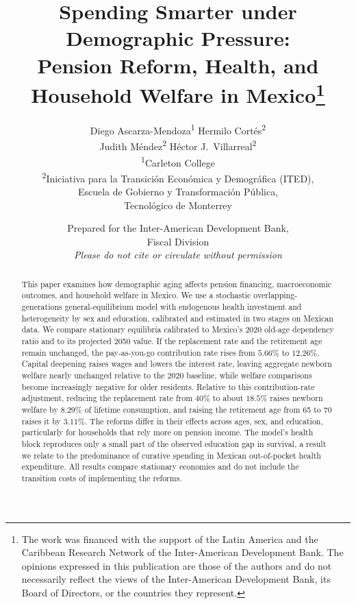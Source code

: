 \documentclass[12pt,a4paper]{article}
\begin{document}
\title{\textbf{Spending Smarter under Demographic Pressure:}\\[6pt]
Pension Reform, Health, and Household Welfare in Mexico\thanks{The work was financed with the support of the Latin America and the Caribbean Research Network of the Inter-American Development Bank. The opinions expressed in this publication are those of the authors and do not necessarily reflect the views of the Inter-American Development Bank, its Board of Directors, or the countries they represent.}}

\author{
Diego Ascarza-Mendoza\textsuperscript{1} \quad Hermilo Cort\'es\textsuperscript{2}\\[3pt]
Judith M\'endez\textsuperscript{2} \quad H\'ector J.\ Villarreal\textsuperscript{2}
\\[6pt]
\textsuperscript{1}Carleton College\\
\textsuperscript{2}Iniciativa para la Transici\'on Econ\'omica y Demogr\'afica (ITED),\\
Escuela de Gobierno y Transformaci\'on P\'ublica,\\
Tecnol\'ogico de Monterrey
}
\date{%
Prepared for the Inter-American Development Bank,\\
Fiscal Division\\[12pt]
\textit{Please do not cite or circulate without permission}
}

\maketitle



\begin{abstract}
This paper examines how demographic aging affects pension financing, macroeconomic outcomes, and household welfare in Mexico. We use a stochastic overlapping-generations general-equilibrium model with endogenous health investment and heterogeneity by sex and education, calibrated and estimated in two stages on Mexican data. We compare stationary equilibria calibrated to Mexico's 2020 old-age dependency ratio and to its projected 2050 value. If the replacement rate and the retirement age remain unchanged, the pay-as-you-go contribution rate rises from $5.66\%$ to $12.26\%$. Capital deepening raises wages and lowers the interest rate, leaving aggregate newborn welfare nearly unchanged relative to the 2020 baseline, while welfare comparisons become increasingly negative for older residents. Relative to this contribution-rate adjustment, reducing the replacement rate from $40\%$ to about $18.5\%$ raises newborn welfare by $8.29\%$ of lifetime consumption, and raising the retirement age from 65 to 70 raises it by $3.11\%$. The reforms differ in their effects across ages, sex, and education, particularly for households that rely more on pension income. The model's health block reproduces only a small part of the observed education gap in survival, a result we relate to the predominance of curative spending in Mexican out-of-pocket health expenditure. All results compare stationary economies and do not include the transition costs of implementing the reforms.
\end{abstract}
\end{document}
